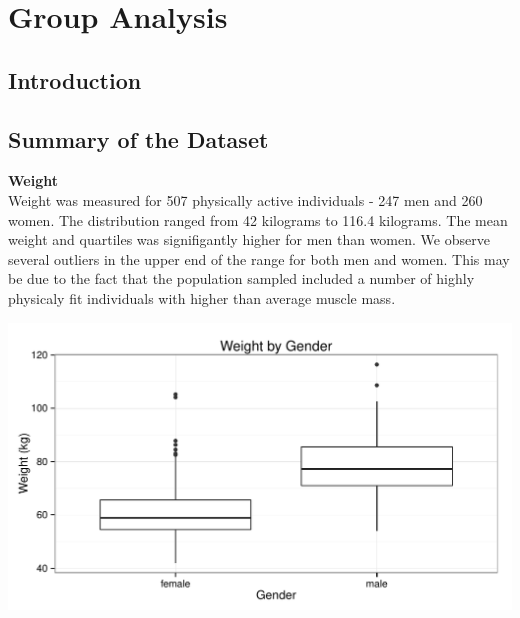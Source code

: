 \documentclass[11pt]{article}\usepackage[]{graphicx}\usepackage[]{color}
\makeatletter
\def\maxwidth{ %
  \ifdim\Gin@nat@width>\linewidth
    \linewidth
  \else
    \Gin@nat@width
  \fi
}
\newenvironment{knitrout}{}{} %
\makeatother
\begin{document}
\section{Group Analysis} 


\subsection{Introduction}







\subsection{Summary of the Dataset}


\textbf{Weight}\\
   
Weight was measured for 507 physically active individuals - 247 men and 260 women. The distribution ranged from 42 kilograms to 116.4 kilograms. The mean weight and quartiles was signifigantly higher for men than women. We observe several outliers in the upper end of the range for both men and women. This may be due to the fact that the population sampled included a number of highly physicaly fit individuals with higher than average muscle mass.

\begin{knitrout}
\color{fgcolor}
\includegraphics[width=\maxwidth]{figure/weight_plot} 

\end{knitrout}
\end{document}
